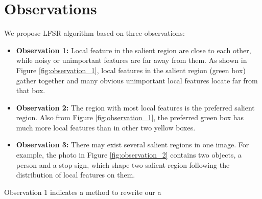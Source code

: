 \section{Observations}

We propose LFSR algorithm based on three observations:

\begin{itemize}
	
	\item {\bf Observation 1:} Local feature in the salient region are close to each other, while noisy or unimportant features are far away from them. As shown in Figure \ref{fig:observation_1}, local features in the salient region (green box) gather together and many obvious unimportant local features locate far from that box.

	\item {\bf Observation 2:} The region with most local features is the preferred salient region. Also from Figure \ref{fig:observation_1}, the preferred green box has much more local features than in other two yellow boxes.

	\item {\bf Observation 3:} There may exist several salient regions in one image. For example, the photo in Figure \ref{fig:observation_2} contains two objects, a person and a stop sign, which shape two salient region following the distribution of local features on them.

\end{itemize}

Observation 1 indicates a method to rewrite our a
